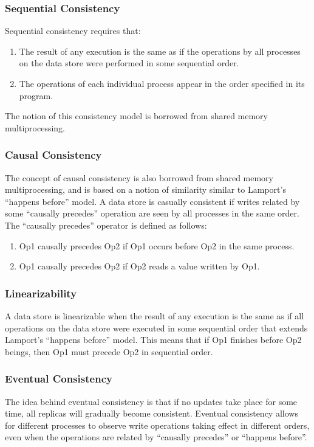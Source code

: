 \documentclass[12pt,titlepage]{article}
\begin{document}
      \subsubsection{Sequential Consistency}
        Sequential consistency requires that:
          \begin{enumerate}
            \item The result of any execution is the same as if the operations by all processes on the data store were performed in some
              sequential order.
            \item The operations of each individual process appear in the order specified in its program.
          \end{enumerate}
        The notion of this consistency model is borrowed from shared memory multiprocessing.

      \subsubsection{Causal Consistency}
        The concept of causal consistency is also borrowed from shared memory multiprocessing, and is based on a notion of similarity similar
        to Lamport's ``happens before'' model. A data store is casually consistent if writes related by some ``causally precedes'' operation
        are seen by all processes in the same order. The ``causally precedes'' operator is defined as follows:
          \begin{enumerate}
            \item Op1 causally precedes Op2 if Op1 occurs before Op2 in the same process.
            \item Op1 causally precedes Op2 if Op2 reads a value written by Op1.
          \end{enumerate}

      \subsubsection{Linearizability}
        A data store is linearizable when the result of any execution is the same as if all operations on the data store were executed in some
        sequential order that extends Lamport's ``happens before'' model. This means that if Op1 finishes before Op2 beings, then Op1 must precede
        Op2 in sequential order.

      \subsubsection{Eventual Consistency}
        The idea behind eventual consistency is that if no updates take place for some time, all replicas will gradually become consistent.
        Eventual consistency allows for different processes to observe write operations taking effect in different orders, even when the operations
        are related by ``causally precedes'' or ``happens before''.
\end{document}
